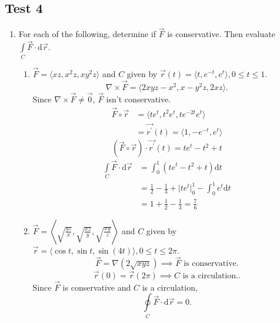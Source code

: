 \subsection{Test 4}
\begin{enumerate}
	\item For each of the following, determine if $\vec{F}$ is conservative. Then evaluate $\int\limits_{C}{\vec{F}\cdot\mathrm{d}\vec{r}}$.
	\begin{enumerate}[label=\alph*.]
		\item $\vec{F} = \langle xz, x^2z, xy^2z \rangle$ and $C$ given by $\vec{r}(t) = \langle t, e^{-t}, e^t\rangle, 0 \leq t \leq 1$.
		\begin{equation*}
			\nabla \times \vec{F} = \langle 2xyz-x^2, x-y^2z, 2xz \rangle.
		\end{equation*}
		Since $\nabla \times \vec{F} \neq \vec{0}$, $\vec{F}$ isn't conservative.
		\begin{align*}
			\vec{F}\circ\vec{r} &= \langle te^t, t^2e^t, te^{-2t}e^t \rangle \\
			&= \vec{r^\prime}(t) = \langle 1, -e^{-t}, e^t\rangle
		\end{align*}
		\begin{equation*}
			\left(\vec{F}\circ\vec{r}\right) \cdot \vec{r^\prime}(t) = te^t - t^2 + t
		\end{equation*}
		\begin{align*}
			\int\limits_{C}{\vec{F} \cdot \mathrm{d}\vec{r}} &= \int_{0}^{1}{\left(te^t - t^2 + t\right)\mathrm{d}t} \\
			&= \frac{1}{2} - \frac{1}{3} + \lvert te^t\rvert_{0}^{1} - \int_{0}^{1}{e^t\mathrm{d}t} \\
			&= 1 + \frac{1}{2} - \frac{1}{3} = \frac{7}{6}
		\end{align*}
		
		\item $\vec{F} = \left< \sqrt{\frac{yz}{x}}, \sqrt{\frac{xz}{y}}, \sqrt{\frac{xy}{z}} \right>$ and $C$ given by $\vec{r} = \langle \cos{t}, \sin{t}, \sin{(4t)} \rangle, 0 \leq t \leq 2\pi$.
		\begin{equation*}
			\vec{F} = \nabla(2\sqrt{xyz}) \implies \vec{F}  \text{ is conservative.}
		\end{equation*}
		\begin{equation*}
			\vec{r}(0) = \vec{r}(2\pi) \implies C \text{ is a circulation.}.
		\end{equation*}
		Since $\vec{F}$ is conservative and $C$ is a circulation,
		\begin{equation*}
			\oint\limits_{C}{\vec{F} \cdot \mathrm{d}\vec{r}} = 0.
		\end{equation*}
		

\end{enumerate}
\end{enumerate}
